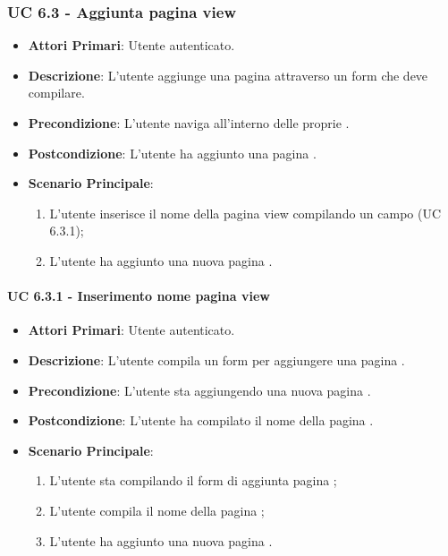 			\subsubsection{UC 6.3 - Aggiunta pagina view}
			\begin{itemize}
				\item \textbf{Attori Primari}: Utente autenticato.
				\item \textbf{Descrizione}: L'utente aggiunge una pagina  attraverso un form che deve compilare.
				\item \textbf{Precondizione}: L'utente naviga all'interno delle proprie .
				\item \textbf{Postcondizione}: L'utente ha aggiunto una pagina .
				\item \textbf{Scenario Principale}:
				\begin{enumerate}
					\item{L'utente inserisce il nome della pagina view compilando un campo (UC 6.3.1);}
					\item{L'utente ha aggiunto una nuova pagina .}
				\end{enumerate}	
			\end{itemize}

			\paragraph{UC 6.3.1 - Inserimento nome pagina view}
			\begin{itemize}
				\item \textbf{Attori Primari}: Utente autenticato.
				\item \textbf{Descrizione}: L'utente compila un form per aggiungere una pagina .
				\item \textbf{Precondizione}: L'utente sta aggiungendo una nuova pagina .
				\item \textbf{Postcondizione}: L'utente ha compilato il nome della pagina .
				\item \textbf{Scenario Principale}:
				\begin{enumerate}
					\item{L'utente sta compilando il form di aggiunta pagina ;}
					\item{L'utente compila il nome della pagina ;}
					\item{L'utente ha aggiunto una nuova pagina .}
				\end{enumerate}	
			\end{itemize}

